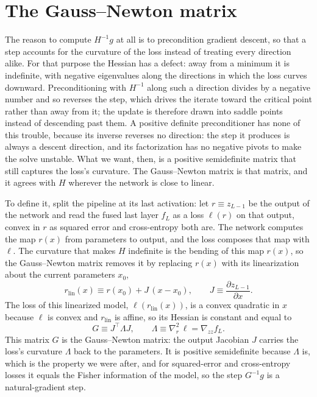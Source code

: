 \documentclass{article}
\begin{document}
\section{The Gauss--Newton matrix}

The reason to compute $H^{-1} g$ at all is to precondition gradient descent, so
that a step accounts for the curvature of the loss instead of treating every
direction alike. For that purpose the Hessian has a defect: away from a minimum
it is indefinite, with negative eigenvalues along the directions in which the
loss curves downward. Preconditioning with $H^{-1}$ along such a direction
divides by a negative number and so reverses the step, which drives the iterate
toward the critical point rather than away from it; the update is therefore drawn
into saddle points instead of descending past them. A positive definite
preconditioner has none of this trouble, because its inverse reverses no
direction: the step it produces is always a descent direction, and its
factorization has no negative pivots to make the solve unstable. What we want,
then, is a positive semidefinite matrix that still captures the loss's curvature.
The Gauss--Newton matrix is that matrix, and it agrees with $H$ wherever the
network is close to linear.

To define it, split the pipeline at its last activation: let $r \equiv z_{L-1}$
be the output of the network and read the fused last layer $f_L$ as a loss
$\ell(r)$ on that output, convex in $r$ as squared error and cross-entropy both
are. The network computes the map $r(x)$ from parameters to output, and the loss
composes that map with $\ell$. The curvature that makes $H$ indefinite is the
bending of this map $r(x)$, so the Gauss--Newton matrix removes it by replacing
$r(x)$ with its linearization about the current parameters $x_0$,
\begin{equation}
  r_{\mathrm{lin}}(x) \equiv r(x_0) + J\,(x - x_0),
  \qquad
  J \equiv \frac{\partial z_{L-1}}{\partial x}.
\end{equation}
The loss of this linearized model, $\ell\!\left(r_{\mathrm{lin}}(x)\right)$, is a
convex quadratic in $x$ because $\ell$ is convex and $r_{\mathrm{lin}}$ is
affine, so its Hessian is constant and equal to
\begin{equation}
  \label{eq:ggn}
  G \equiv J^\top \Lambda J,
  \qquad
  \Lambda \equiv \nabla^2_r\, \ell = \nabla_{zz} f_L.
\end{equation}
This matrix $G$ is the Gauss--Newton matrix: the output Jacobian $J$ carries the
loss's curvature $\Lambda$ back to the parameters. It is positive semidefinite
because $\Lambda$ is, which is the property we were after, and for squared-error
and cross-entropy losses it equals the Fisher information of the model, so the
step $G^{-1} g$ is a natural-gradient step.
\end{document}
